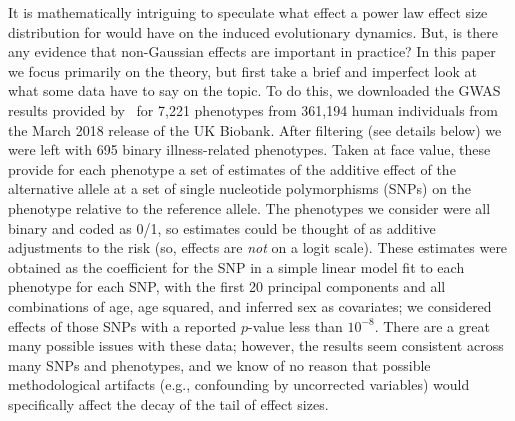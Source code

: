 \documentclass{article}
\newcommand{\1}{\mathbbm{1}}
\theoremstyle{remark}
\theoremstyle{definition}
\begin{document}
It is mathematically intriguing to speculate what effect a power law effect size distribution
for would have on the induced evolutionary dynamics.
But, is there any evidence that non-Gaussian effects are important in practice?
In this paper we focus primarily on the theory,
but first take a brief and imperfect look at what some data have to say on the topic.
To do this, we downloaded the GWAS results provided by~\citet{biobankSNPs}
for 7,221 phenotypes from 361,194 human individuals from the March 2018 release of the UK Biobank.
After filtering (see details below) we were left with 695 binary illness-related phenotypes.
Taken at face value, these provide for each phenotype a set of estimates of the additive effect
of the alternative allele at a set of single nucleotide polymorphisms (SNPs)
on the phenotype relative to the reference allele.
The phenotypes we consider were all binary and coded as 0/1,
so estimates could be thought of as additive adjustments to the risk
(so, effects are \emph{not} on a logit scale).
These estimates were obtained as the coefficient for the SNP in a simple linear model
fit to each phenotype for each SNP,
with the first 20 principal components and all combinations of age, age squared, and inferred sex as covariates;
we considered effects of those SNPs with a reported $p$-value less than $10^{-8}$.
There are a great many possible issues with these data;
however, the results seem consistent across many SNPs and phenotypes,
and we know of no reason that possible methodological artifacts
(e.g., confounding by uncorrected variables)
would specifically affect the decay of the tail of effect sizes.
\end{document}
